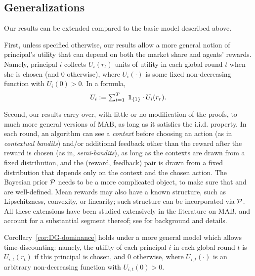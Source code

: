 \subsection{Generalizations}
\label{sec:theory-extensions}


Our results can be extended compared to the basic model described above.


First, unless specified otherwise, our results allow a more general notion of principal's utility that can depend on both the market share and agents' rewards. Namely, principal $i$ collects $U_i(r_t)$ units of utility in each global round $t$ when she is chosen (and $0$ otherwise), where $U_i(\cdot)$ is some fixed non-decreasing function with $U_i(0)>0$. In a formula,
\begin{align}\label{eq:general-utility}
\textstyle U_i := \sum_{t=1}^T\; \indicator{i_t=i}\cdot U_i(r_r).
\end{align}


Second, our results carry over, with little or no modification of the proofs, to much more general versions of MAB, as long as it satisfies the i.i.d. property. In each round, an algorithm can see a \emph{context} before choosing an action (as in \emph{contextual bandits}) and/or additional feedback other than the reward after the reward is chosen (as in, \eg \emph{semi-bandits}), as long as the contexts are drawn from a fixed distribution, and the (reward, feedback) pair is drawn from a fixed distribution that depends only on the context and the chosen action. The Bayesian prior $\prior$ needs to be a more complicated object, to make sure that \PMR and \BIR are well-defined. Mean rewards may also have a known structure, such as Lipschitzness, convexity, or linearity; such structure can be incorporated via $\prior$. All these extensions have been studied extensively in the literature on MAB, and account for a substantial segment thereof; see \cite{Bubeck-survey12} for background and details.

Corollary~\ref{cor:DG-dominance} holds under a more general model which allows time-discounting: namely, the utility of each principal $i$ in each global round $t$ is $U_{i,t}(r_t)$ if this principal is chosen, and $0$ otherwise, where $U_{i,t}(\cdot)$ is an arbitrary non-decreasing function with $U_{i,t}(0)>0$.



